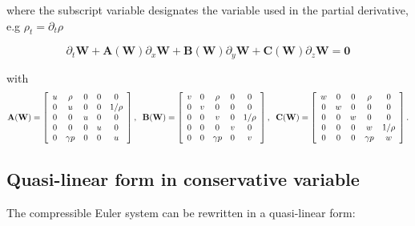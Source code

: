 \documentclass{article}
\begin{document}
where the subscript variable designates the variable used in the partial derivative, e.g $\rho_t = \partial_t \rho$

\begin{equation}
  \partial_t \mathbf{W} + \mathbf{A(W)} \partial_x \mathbf{W} + \mathbf{B(W)} \partial_y \mathbf{W} + \mathbf{C(W)} \partial_z \mathbf{W} = \mathbf{0}
\end{equation}

with
\begin{equation}
  \mathbf{A(W)} = \left[
    \begin{array}{c c c c c}
      u & \rho     & 0 & 0 & 0 \\
      0 & u        & 0 & 0 & 1/\rho\\
      0 & 0        & u & 0 & 0 \\
      0 & 0        & 0 & u & 0 \\
      0 & \gamma p & 0 & 0 & u \\
    \end{array}
  \right],
  \;\;
  \mathbf{B(W)} = \left[
    \begin{array}{c c c c c}
      v & 0 & \rho     & 0 & 0 \\
      0 & v & 0        & 0 & 0\\
      0 & 0 & v        & 0 & 1/\rho \\
      0 & 0 & 0        & v & 0 \\
      0 & 0 & \gamma p & 0 & v \\
    \end{array}
  \right],
  \;\;
  \mathbf{C(W)} = \left[
    \begin{array}{c c c c c}
      w & 0 & 0 & \rho     & 0 \\
      0 & w & 0 & 0        & 0\\
      0 & 0 & w & 0        & 0 \\
      0 & 0 & 0 & w        & 1/\rho \\
      0 & 0 & 0 & \gamma p & w \\
    \end{array}
  \right].
\end{equation}


\subsection{Quasi-linear form in conservative variable}

The compressible Euler system can be rewritten in a quasi-linear form:
\end{document}
